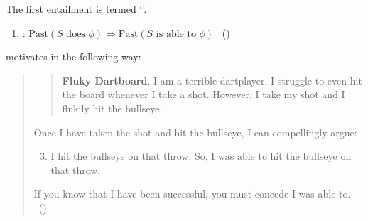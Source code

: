 \begin{note}
  The first entailment is termed `\BoyPS{}'.

  \begin{enumerate}[label=]
  \item
    \label{Boylan:Past-Success}
    \BoyPS{}: \(\text{Past}(S\text{ does }\phi) \Rightarrow \text{Past}(S\text{ is able to }\phi)\)%
    \mbox{ }\hfill\mbox{(\citeyear[\S1.1]{Boylan:2020aa})}
  \end{enumerate}
  \citeauthor{Boylan:2020aa} motivates \BoyPS{} in the following way:
  \begin{quote}
    \begin{quote}
      \textbf{Fluky Dartboard}.
      I am a terrible dartplayer.
      I struggle to even hit the board whenever I take a shot.
      However, I take my shot and I flukily hit the bullseye.
    \end{quote}
    Once I have taken the shot and hit the bullseye, I can compellingly argue:
    \begin{enumerate}
      \setcounter{enumi}{2}
    \item
      I hit the bullseye on that throw.\newline
      So, I was able to hit the bullseye on that throw.
    \end{enumerate}
    If you know that I have been successful, you must concede I was able to.\newline
    \mbox{ }\hfill\mbox{(\citeyear[2]{Boylan:2020aa})}
  \end{quote}


\end{note}
